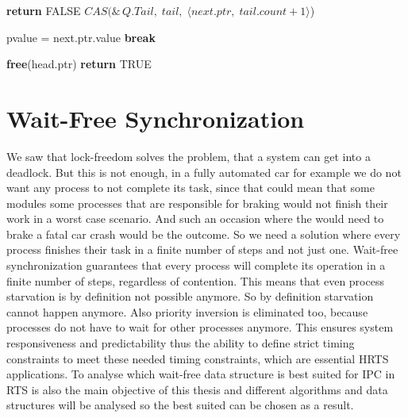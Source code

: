 \begin{algorithm}[!ht]
\begin{algorithmic}[1]
                        \State \textbf{return} FALSE
                    \Else
                        \State 
                        $CAS(\&\,Q.Tail,\; tail,\; \langle next.ptr,\; tail.count+1\rangle$)
                    \EndIf
    
                \Else
                    \State *pvalue = next.ptr.value
                        \State \textbf{break}
                    \EndIf
                \EndIf
            \EndIf
        \EndLoop
    
        \State \textbf{free}(head.ptr)
        \State \textbf{return} TRUE
    
    \EndFunction
    
    \end{algorithmic}
\end{algorithm}


\section{Wait-Free Synchronization}\label{sec:wait-free}

We saw that lock-freedom solves the problem, that a system can get into a deadlock. But this is not enough, in a fully automated car for example we do not want any process to not complete its task, since that could mean that some modules some processes that are responsible for braking would not finish their work in a worst case scenario. And such an occasion where the would need to brake a fatal car crash would be the outcome. So we need a solution where every process finishes their task in a finite number of steps and not just one. Wait-free synchronization guarantees that every process will complete its operation in a finite number of steps, regardless of contention. This means that even process starvation is by definition not possible anymore. So by definition starvation cannot happen anymore. Also priority inversion is eliminated too, because processes do not have to wait for other processes anymore. This ensures system responsiveness and predictability thus the ability to define strict timing constraints to meet these needed timing constraints, which are essential \ac{HRTS} applications. To analyse which wait-free data structure is best suited for \ac{IPC} in \ac{RTS} is also the main objective of this thesis and different algorithms and data structures will be analysed so the best suited can be chosen as a result.

